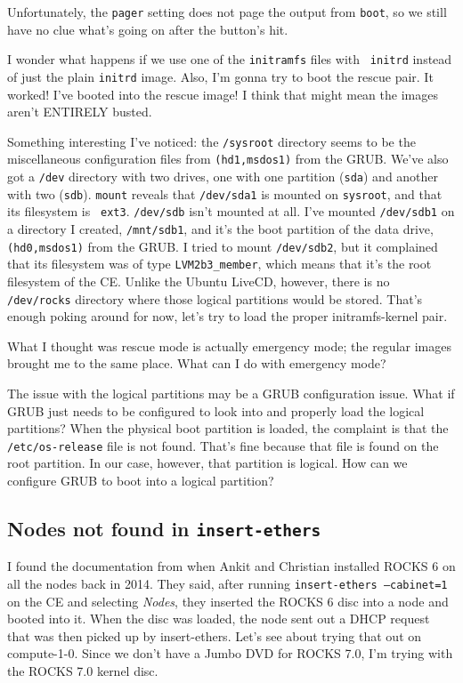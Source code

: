 \documentclass[12pt]{article}
\begin{document}
Unfortunately, the {\tt pager} setting does not page the output from {\tt boot},
so we still have no clue what's going on after the button's hit.

\qq I wonder what happens if we use one of the {\tt initramfs} files with {\tt
  initrd} instead of just the plain {\tt initrd} image. Also, I'm gonna try to
boot the rescue pair. It worked! I've booted into the rescue image! I think that
might mean the images aren't ENTIRELY busted. 

\qq Something interesting I've noticed: the {\tt /sysroot} directory seems to be
the miscellaneous configuration files from {\tt (hd1,msdos1)} from the
GRUB. We've also got a {\tt /dev} directory with two drives, one with one
partition ({\tt sda}) and another with two ({\tt sdb}). {\tt mount} reveals that
{\tt /dev/sda1} is mounted on {\tt sysroot}, and that its filesystem is {\tt
  ext3}. {\tt /dev/sdb} isn't mounted at all. I've mounted {\tt /dev/sdb1} on a
directory I created, {\tt /mnt/sdb1}, and it's the boot partition of the data
drive, {\tt (hd0,msdos1)} from the GRUB. I tried to mount {\tt /dev/sdb2}, but
it complained that its filesystem was of type {\tt LVM2b3\_member}, which means
that it's the root filesystem of the CE. Unlike the Ubuntu LiveCD, however,
there is no {\tt /dev/rocks} directory where those logical partitions would be
stored. That's enough poking around for now, let's try to load the proper
initramfs-kernel pair.

\qq What I thought was rescue mode is actually emergency mode; the regular
images brought me to the same place. What can I do with emergency mode?

\qq The issue with the logical partitions may be a GRUB configuration
issue. What if GRUB just needs to be configured to look into and properly load
the logical partitions? When the physical boot partition is loaded, the
complaint is that the {\tt /etc/os-release} file is not found. That's fine
because that file is found on the root partition. In our case, however, that
partition is logical. How can we configure GRUB to boot into a logical
partition?

\subsection{Nodes not found in {\tt insert-ethers}}

\qq I found the documentation from when Ankit and Christian installed ROCKS 6 on
all the nodes back in 2014. They said, after running {\tt insert-ethers
  --cabinet=1} on the CE and selecting \textit{Nodes}, they inserted the ROCKS 6
disc into a node and booted into it. When the disc was loaded, the node sent out
a DHCP request that was then picked up by insert-ethers. Let's see about trying
that out on compute-1-0. Since we don't have a Jumbo DVD for ROCKS 7.0, I'm
trying with the ROCKS 7.0 kernel disc. 
\end{document}
